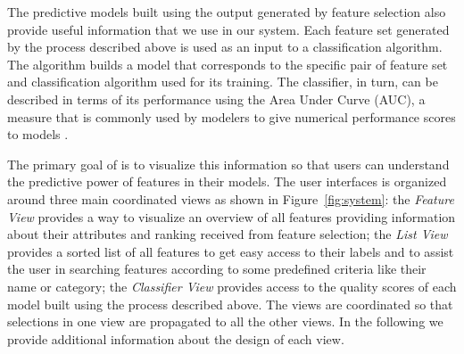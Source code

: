 The predictive models built using the output generated by feature selection also provide useful information that we use in our system. Each feature set generated by the process described above is used as an input to a classification algorithm. The algorithm builds a model that corresponds to the specific pair of feature set and classification algorithm used for its training. The classifier, in turn, can be described in terms of its performance using the Area Under Curve (AUC), a measure that is commonly used by modelers to give numerical performance scores to models \cite{kuhn2013applied}.


The primary goal of \infuse is to visualize this information so that users can understand the predictive power of features in their models. The user interfaces is organized around three main coordinated views as shown in Figure~\ref{fig:system}: the \textit{Feature View} provides a way to visualize an overview of all features providing information about their attributes and ranking received from feature selection; the \textit{List View} provides a sorted list of all features to get easy access to their labels and to assist the user in searching features according to some predefined criteria like their name or category; the \textit{Classifier View} provides access to the quality scores of each model built using the process described above. The views are coordinated so that selections in one view are propagated to all the other views. In the following we provide additional information about the design of each view.



